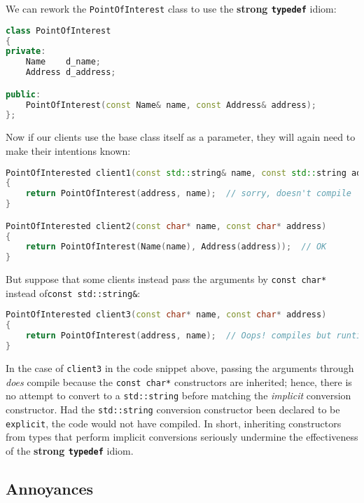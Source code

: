 \noindent We can rework the \texttt{PointOfInterest} class to use the
\textbf{strong \texttt{typedef}} idiom:

\begin{lstlisting}[language=C++]
class PointOfInterest
{
private:
    Name    d_name;
    Address d_address;

public:
    PointOfInterest(const Name& name, const Address& address);
};
\end{lstlisting}

\noindent Now if our clients use the base class itself as a parameter, they will
again need to make their intentions known:

\begin{lstlisting}[language=C++]
PointOfInterested client1(const std::string& name, const std::string address)
{
    return PointOfInterest(address, name);  // sorry, doesn't compile
}

PointOfInterested client2(const char* name, const char* address)
{
    return PointOfInterest(Name(name), Address(address));  // OK
}
\end{lstlisting}

\noindent But suppose that some clients instead pass the arguments by
\texttt{const}~\texttt{char*} instead of\linebreak[4]
\mbox{\texttt{const}~\texttt{std::string\&}}:

\begin{lstlisting}[language=C++]
PointOfInterested client3(const char* name, const char* address)
{
    return PointOfInterest(address, name);  // Oops! compiles but runtime error
}
\end{lstlisting}

\noindent In the case of \texttt{client3} in the code snippet above, passing the arguments through
\emph{does} compile because the \texttt{const}~\texttt{char*}
constructors are inherited; hence, there is no attempt to convert
to a \texttt{std::string} before matching the \emph{implicit} conversion
constructor. Had the \texttt{std::string} conversion
constructor been declared to be \texttt{explicit}, the code would not
have compiled. In short, inheriting constructors from types that perform implicit
conversions seriously undermine the effectiveness of the \textbf{strong
\texttt{typedef}} idiom.

\subsection[Annoyances]{Annoyances}\label{annoyances-inheritingctor}

